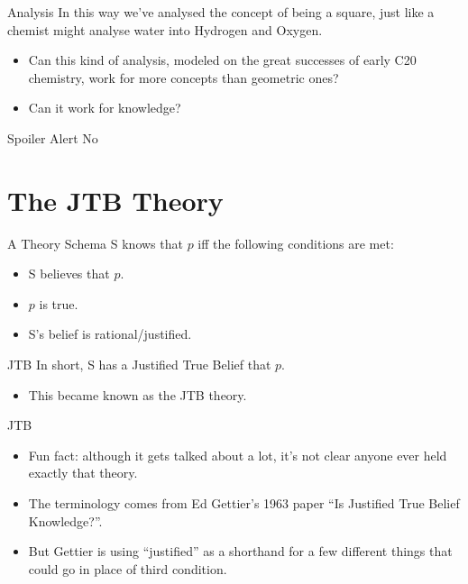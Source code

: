\documentclass[
  17pt,
  letterpaper,
  ignorenonframetext,
  aspectratio=169,
  handout]{beamer}
\providecommand{\tightlist}{%
  \setlength{\itemsep}{0pt}\setlength{\parskip}{0pt}}\usepackage{longtable,booktabs,array}
\begin{document}
\begin{frame}{Analysis}
\protect\hypertarget{analysis-1}{}
In this way we've analysed the concept of being a square, just like a
chemist might analyse water into Hydrogen and Oxygen.

\begin{itemize}[<+->]
\tightlist
\item
  Can this kind of analysis, modeled on the great successes of early C20
  chemistry, work for more concepts than geometric ones?
\item
  Can it work for knowledge?
\end{itemize}
\end{frame}

\begin{frame}{Spoiler Alert}
\protect\hypertarget{spoiler-alert}{}
No
\end{frame}

\hypertarget{the-jtb-theory}{%
\section{The JTB Theory}\label{the-jtb-theory}}

\begin{frame}{A Theory Schema}
\protect\hypertarget{a-theory-schema}{}
S knows that \(p\) iff the following conditions are met:

\begin{itemize}[<+->]
\tightlist
\item
  S believes that \(p\).
\item
  \(p\) is true.
\item
  S's belief is rational/justified.
\end{itemize}
\end{frame}

\begin{frame}{JTB}
\protect\hypertarget{jtb}{}
In short, S has a Justified True Belief that \(p\).

\begin{itemize}[<+->]
\tightlist
\item
  This became known as the JTB theory.
\end{itemize}
\end{frame}

\begin{frame}{JTB}
\protect\hypertarget{jtb-1}{}
\begin{itemize}[<+->]
\tightlist
\item
  Fun fact: although it gets talked about a lot, it's not clear anyone
  ever held exactly that theory.
\item
  The terminology comes from Ed Gettier's 1963 paper ``Is Justified True
  Belief Knowledge?''.
\item
  But Gettier is using ``justified'' as a shorthand for a few different
  things that could go in place of third condition.
\end{itemize}
\end{frame}
\end{document}
